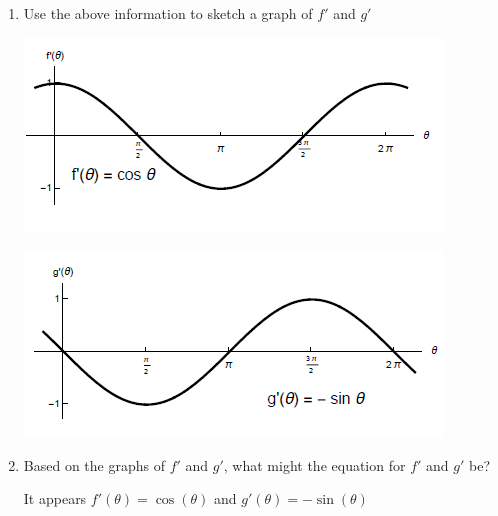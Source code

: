 \documentclass[nooutcomes,handout]{ximera}
\begin{document}
\begin{problem}
\begin{enumerate}
		\item Use the above information to sketch a graph of $f'$ and $g'$
		\begin{freeResponse} \hfil
		\begin{image}
		\includegraphics{figure10.png}
		\end{image}
		\begin{image}
		\includegraphics{figure11.png}
		\end{image}
		\end{freeResponse}

	\item Based on the graphs of $f'$ and $g'$, what might the equation for $f'$ and $g'$ be?
		\begin{freeResponse}
			It appears $f'(\theta)=\cos(\theta)$ and $g'(\theta)=-\sin(\theta)$
		\end{freeResponse}


\end{enumerate}
\end{problem}
\end{document}
